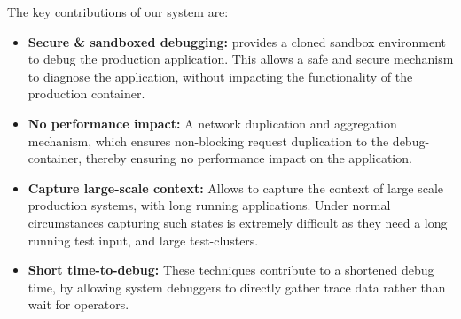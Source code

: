 \noindent
The key contributions of our system are:
\begin{itemize}[leftmargin=*,topsep=0pt,itemsep=-1ex,partopsep=1ex,parsep=1ex]
\item \textbf{Secure \& sandboxed debugging:} \parikshan provides a cloned sandbox environment to debug the production application.
This allows a safe and secure mechanism to diagnose the application, without impacting the functionality of the production container.
\item \textbf{No performance impact:} A network duplication and aggregation mechanism, which ensures non-blocking request duplication to the debug-container, thereby ensuring no performance impact on the application. 
\item \textbf{Capture large-scale context:} Allows to capture the context of large scale production systems, with long running applications. Under normal circumstances capturing such states is extremely difficult as they need a long running test input, and large test-clusters.
\item \textbf{Short time-to-debug:} These techniques contribute to a shortened debug time, by allowing system debuggers to directly gather trace data rather than wait for operators. 


\end{itemize}
